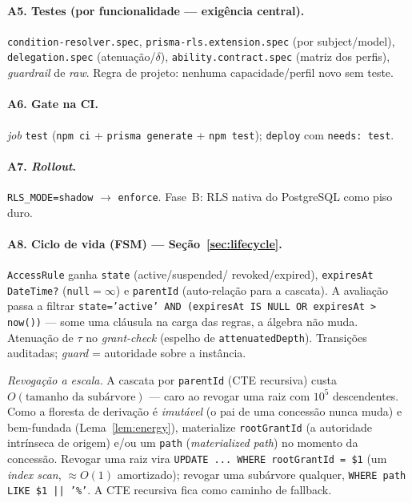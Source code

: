 \documentclass[11pt,a4paper]{article}
\theoremstyle{definition}
\newcommand{\dep}{\delta}
\begin{document}
  \paragraph{A5. Testes (por funcionalidade --- exigência central).}
  \texttt{condition-resolver.spec}, \texttt{prisma-rls.extension.spec} (por
  subject/model), \texttt{delegation.spec} (atenuação/$\dep$),
  \texttt{ability.contract.spec} (matriz dos perfis), \emph{guardrail} de
  \emph{raw}. Regra de projeto: nenhuma capacidade/perfil novo sem teste.

  \paragraph{A6. Gate na CI.}
  \emph{job} \texttt{test} (\texttt{npm ci} + \texttt{prisma generate} +
  \texttt{npm test}); \texttt{deploy} com \texttt{needs: test}.

  \paragraph{A7. \emph{Rollout}.}
  \texttt{RLS\_MODE=shadow} $\to$ \texttt{enforce}. Fase~B: RLS nativa do
  PostgreSQL como piso duro.

  \paragraph{A8. Ciclo de vida (FSM) --- Seção~\ref{sec:lifecycle}.}
  \texttt{AccessRule} ganha \texttt{state} (\textsf{active}/\textsf{suspended}/
  \textsf{revoked}/\textsf{expired}), \texttt{expiresAt DateTime?}
  (\texttt{null}$=\infty$) e \texttt{parentId} (auto-relação para a cascata).
  A avaliação passa a filtrar \texttt{state='active' AND (expiresAt IS NULL OR
  expiresAt > now())} --- some uma cláusula na carga das regras, a álgebra não
  muda. Atenuação de $\tau$ no \emph{grant-check} (espelho de
  \texttt{attenuatedDepth}). Transições auditadas; \emph{guard} = autoridade
  sobre a instância.

  \emph{Revogação a escala.} A cascata por \texttt{parentId} (CTE recursiva)
  custa $O(\text{tamanho da subárvore})$ --- caro ao revogar uma raiz com
  $10^5$ descendentes. Como a floresta de derivação é \emph{imutável} (o pai de
  uma concessão nunca muda) e bem-fundada (Lema~\ref{lem:energy}), materialize
  \texttt{rootGrantId} (a autoridade intrínseca de origem) e/ou um
  \texttt{path} (\emph{materialized path}) no momento da concessão. Revogar uma
  raiz vira \texttt{UPDATE ... WHERE rootGrantId = \$1} (um \emph{index scan},
  $\approx O(1)$ amortizado); revogar uma subárvore qualquer,
  \texttt{WHERE path LIKE \$1 || '\%'}. A CTE recursiva fica como caminho de
  fallback.

  
\end{document}
